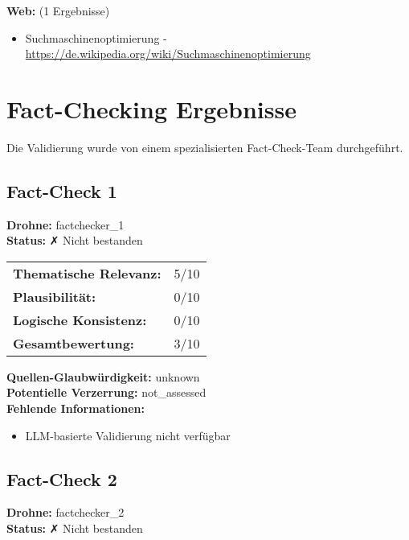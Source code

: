 \documentclass[12pt,a4paper]{article}
\begin{document}
\textbf{Web:} (1 Ergebnisse)
\begin{itemize}
\item Suchmaschinenoptimierung - \url{https://de.wikipedia.org/wiki/Suchmaschinenoptimierung}
\end{itemize}


\newpage
\section{Fact-Checking Ergebnisse}

Die Validierung wurde von einem spezialisierten Fact-Check-Team durchgeführt.


\subsection{Fact-Check 1}

\textbf{Drohne:} factchecker\_1\\
\textbf{Status:} ✗ Nicht bestanden\\

\begin{tabular}{ll}
\textbf{Thematische Relevanz:} & 5/10 \\
\textbf{Plausibilität:} & 0/10 \\
\textbf{Logische Konsistenz:} & 0/10 \\
\textbf{Gesamtbewertung:} & 3/10 \\
\end{tabular}

\textbf{Quellen-Glaubwürdigkeit:} unknown\\
\textbf{Potentielle Verzerrung:} not\_assessed\\
\textbf{Fehlende Informationen:}
\begin{itemize}
\item LLM-basierte Validierung nicht verfügbar
\end{itemize}

\subsection{Fact-Check 2}

\textbf{Drohne:} factchecker\_2\\
\textbf{Status:} ✗ Nicht bestanden\\
\end{document}
